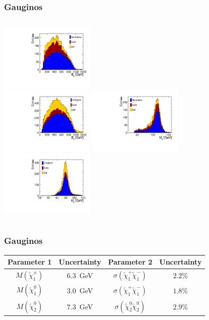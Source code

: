 \documentclass{beamer}
\begin{document}
\begin{frame}
\frametitle{Gauginos}
\begin{columns}[c]
\column{4.5cm}
\centering
\includegraphics[width=4.5cm]{NeutralinoSel_E.pdf}\\
\includegraphics[width=4.5cm]{CharginoSel_E.pdf}
\column{4.5cm}
\centering
\includegraphics[width=4.5cm]{NeutralinoSel_M.pdf}\\
\includegraphics[width=4.5cm]{CharginoSel_M.pdf}
\end{columns}
\end{frame}
\begin{frame}
\frametitle{Gauginos}
\begin{center}
\begin{tabular}{c c c c}
       \toprule
       Parameter 1                & Uncertainty &          Parameter 2 & Uncertainty \\
       \midrule
       $M(\tilde{\chi}_{1}^{\pm})$ & $6.3$~GeV & $\sigma(\tilde{\chi}_{1}^{+}\tilde{\chi}_{1}^{-})$  & $2.2$\% \\
       $M(\tilde{\chi}_{1}^{0})$   & $3.0$~GeV & $\sigma(\tilde{\chi}_{1}^{+}\tilde{\chi}_{1}^{-})$  & $1.8$\% \\
       $M(\tilde{\chi}_{2}^{0})$   & $7.3$~GeV & $\sigma(\tilde{\chi}_{2}^{0}\tilde{\chi}_{2}^{0})$  & $2.9$\% \\
\end{tabular}
\end{center}
\end{frame}
\end{document}

